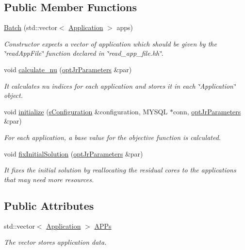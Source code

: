 \subsection*{Public Member Functions}
\begin{DoxyCompactItemize}
\item 
\hyperlink{classBatch_aea459d16c99c2f02af53b3ad5b0ff12d}{Batch} (std\-::vector$<$ \hyperlink{classApplication}{Application} $>$ apps)
\begin{DoxyCompactList}\small\item\em Constructor expects a vector of application which should be given by the \char`\"{}read\-App\-File\char`\"{} function declared in \char`\"{}read\-\_\-app\-\_\-file.\-hh\char`\"{}. \end{DoxyCompactList}\item 
void \hyperlink{classBatch_a14f132321413b45d6446200807451414}{calculate\-\_\-nu} (\hyperlink{classoptJrParameters}{opt\-Jr\-Parameters} \&par)
\begin{DoxyCompactList}\small\item\em It calculates nu indices for each application and stores it in each \char`\"{}\-Application\char`\"{} object. \end{DoxyCompactList}\item 
void \hyperlink{classBatch_ae212d22fa812b51160f57507242152c1}{initialize} (\hyperlink{readConfigurationFile_8hh_ab8f35b1da3261263c5e9c0e7c8921f5c}{s\-Configuration} \&configuration, M\-Y\-S\-Q\-L $\ast$conn, \hyperlink{classoptJrParameters}{opt\-Jr\-Parameters} \&par)
\begin{DoxyCompactList}\small\item\em For each application, a base value for the objective function is calculated. \end{DoxyCompactList}\item 
void \hyperlink{classBatch_ac50dad870490ca7c60e0e15d86c02614}{fix\-Initial\-Solution} (\hyperlink{classoptJrParameters}{opt\-Jr\-Parameters} \&par)
\begin{DoxyCompactList}\small\item\em It fixes the initial solution by reallocating the residual cores to the applications that may need more resources. \end{DoxyCompactList}\end{DoxyCompactItemize}
\subsection*{Public Attributes}
\begin{DoxyCompactItemize}
\item 
std\-::vector$<$ \hyperlink{classApplication}{Application} $>$ \hyperlink{classBatch_a757bf1a36fee46b1b47263ab4a59c560}{A\-P\-Ps}
\begin{DoxyCompactList}\small\item\em The vector stores application data. \end{DoxyCompactList}\end{DoxyCompactItemize}


